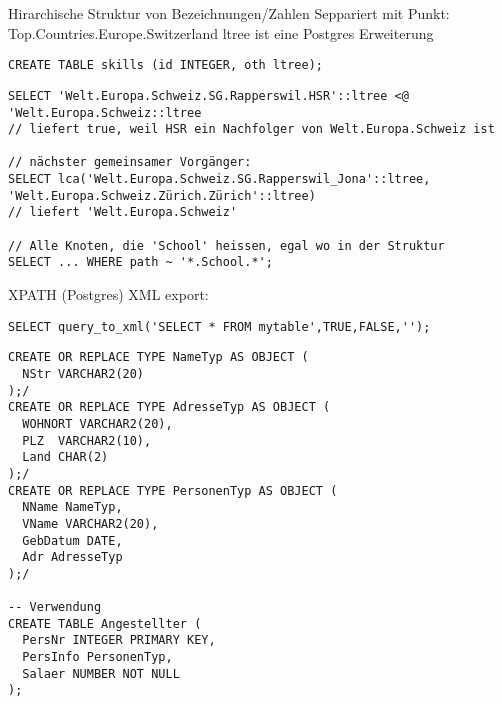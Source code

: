 \documentclass[ngerman,a4paper,12pt]{scrreprt}
\begin{document}
\ul
	\li Hirarchische Struktur von Bezeichnungen/Zahlen
	\li Seppariert mit Punkt: Top.Countries.Europe.Switzerland
	\li ltree ist eine Postgres Erweiterung
\ulE
\begin{verbatim}
CREATE TABLE skills (id INTEGER, oth ltree);
\end{verbatim}

\begin{verbatim}
SELECT 'Welt.Europa.Schweiz.SG.Rapperswil.HSR'::ltree <@ 'Welt.Europa.Schweiz::ltree
// liefert true, weil HSR ein Nachfolger von Welt.Europa.Schweiz ist

// nächster gemeinsamer Vorgänger:
SELECT lca('Welt.Europa.Schweiz.SG.Rapperswil_Jona'::ltree, 'Welt.Europa.Schweiz.Zürich.Zürich'::ltree)
// liefert 'Welt.Europa.Schweiz'

// Alle Knoten, die 'School' heissen, egal wo in der Struktur
SELECT ... WHERE path ~ '*.School.*';
\end{verbatim}

\ul
	\li XPATH (Postgres)
	\li XML export: 
		\begin{verbatim}SELECT query_to_xml('SELECT * FROM mytable',TRUE,FALSE,''); \end{verbatim}
\ulE





\begin{verbatim}
CREATE OR REPLACE TYPE NameTyp AS OBJECT (
  NStr VARCHAR2(20)
);/
CREATE OR REPLACE TYPE AdresseTyp AS OBJECT (
  WOHNORT VARCHAR2(20),
  PLZ  VARCHAR2(10),
  Land CHAR(2)
);/
CREATE OR REPLACE TYPE PersonenTyp AS OBJECT (
  NName NameTyp,
  VName VARCHAR2(20),
  GebDatum DATE,
  Adr AdresseTyp
);/

-- Verwendung
CREATE TABLE Angestellter (
  PersNr INTEGER PRIMARY KEY,
  PersInfo PersonenTyp,
  Salaer NUMBER NOT NULL
);
\end{verbatim}
\end{document}
